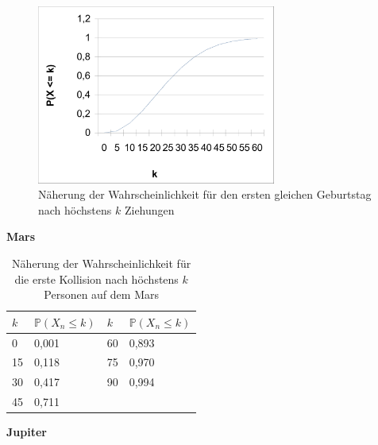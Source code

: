 \documentclass[../main.tex]{subfiles}
\begin{document}
    \begin{figure}[h]
        \begin{center}
            \includegraphics[width=0.7\textwidth]{../graphics/perde.png}
        \end{center}
        \caption{\label{num.fpe} Näherung der Wahrscheinlichkeit für den ersten gleichen Geburtstag nach höchstens $k$ Ziehungen}
    \end{figure}


    \textbf{Mars}

    \begin{table}[h]
        \centering
        \begin{tabular}{|l|l|l|l|}
            \hline
            $k$ & $\mathbb{P}(X_{n} \leq k)$ & $k$ & $\mathbb{P}(X_{n} \leq k)$ \\ \hline
            0   & 0,001                      & 60  & 0,893                      \\
            15  & 0,118                      & 75  & 0,970                      \\
            30  & 0,417                      & 90  & 0,994                      \\
            45  & 0,711                      &     &                            \\ \hline
        \end{tabular}
        \caption{\label{num.tpm} Näherung der Wahrscheinlichkeit für die erste Kollision nach höchstens $k$ Personen auf dem Mars}
    \end{table}

    \textbf{Jupiter}
\end{document}
